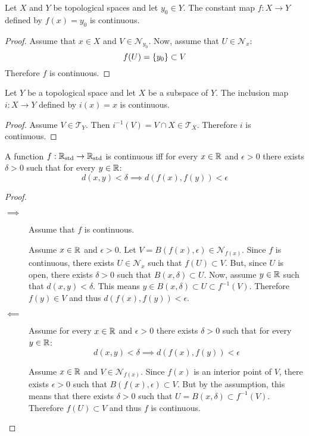 \documentclass[letterpaper,12pt,fleqn]{article}
\newcommand{\T}{\mathscr{T}}
\renewcommand{\N}{\mathcal{N}}
\newcommand{\Rs}{\R_{\text{std}}}
\newcommand{\e}{\epsilon}
\renewcommand{\d}{\delta}
\begin{document}
\begin{theorem}[7.2]
  Let \(X\) and \(Y\) be topological spaces and let \(y_0\in Y\).  The constant map \(f:X\to Y\) defined by
  \(f(x)=y_0\) is continuous.
\end{theorem}

\begin{proof}
  Assume that \(x\in X\) and \(V\in\N_{y_0}\).  Now, assume that \(U\in\N_x\):
  \[f(U)=\{y_0\}\subset V\]
  Therefore \(f\) is continuous.
\end{proof}

\begin{theorem}[7.3]
  Let \(Y\) be a topological space and let \(X\) be a subspace of \(Y\).  The inclusion map \(i:X\to Y\) defined
  by \(i(x)=x\) is continuous.
\end{theorem}

\begin{proof}
  Assume \(V\in\T_Y\).  Then \(i^{-1}(V)=V\cap X\in\T_X\).  Therefore \(i\) is continuous.
\end{proof}

\begin{theorem}[7.5]
  A function \(f:\Rs\to\Rs\) is continuous iff for every \(x\in\mathbb{R}\) and \(\e>0\) there exists \(\d>0\) such that
  for every \(y\in\mathbb{R}\):
  \[d(x,y)<\d\implies d(f(x),f(y))<\e\]
\end{theorem}

\begin{proof}
  \begin{description}
  \item[]
  \item[\(\implies\)] Assume that \(f\) is continuous.

    Assume \(x\in\mathbb{R}\) and \(\e>0\).  Let \(V=B(f(x),\e)\in\N_{f(x)}\).  Since \(f\) is continuous, there exists
    \(U\in\N_x\) such that \(f(U)\subset V\).  But, since \(U\) is open, there exists \(\d>0\) such that
    \(B(x,\d)\subset U\).  Now, assume \(y\in\mathbb{R}\) such that \(d(x,y)<\d\).  This means
    \(y\in B(x,\d)\subset U\subset f^{-1}(V)\).  Therefore \(f(y)\in V\) and thus \(d(f(x),f(y))<\e\).

  \item[\(\impliedby\)] Assume for every \(x\in\mathbb{R}\) and \(\e>0\) there exists \(\d>0\) such that for every \(y\in\mathbb{R}\):
    \[d(x,y)<\d\implies d(f(x),f(y))<\e\]

    Assume \(x\in\mathbb{R}\) and \(V\in\N_{f(x)}\).  Since \(f(x)\) is an interior point of \(V\), there exists \(\e>0\)
    such that \(B(f(x),\e)\subset V\).  But by the assumption, this means that there exists \(\d>0\) such that
    \(U=B(x,\d)\subset f^{-1}(V)\).  Therefore \(f(U)\subset V\) and thus \(f\) is continuous.
  \end{description}
\end{proof}
\end{document}
